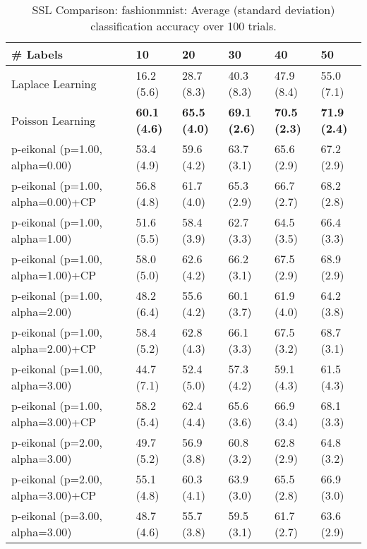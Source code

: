 \documentclass{article}
\begin{document}
\begin{table*}[t!]
\vspace{-3mm}
\caption{SSL Comparison: fashionmnist: Average (standard deviation) classification accuracy over 100 trials.}
\vspace{-3mm}
\label{tab:SSL Comparison: fashionmnist}
\vskip 0.15in
\begin{center}
\begin{small}
\begin{sc}
\begin{tabular}{llllll}
\toprule
\# Labels&\textbf{10}&\textbf{20}&\textbf{30}&\textbf{40}&\textbf{50}\\
\midrule
Laplace Learning&16.2 (5.6)      &28.7 (8.3)      &40.3 (8.3)      &47.9 (8.4)      &55.0 (7.1)      \\
Poisson Learning&{\bf 60.1 (4.6)}&{\bf 65.5 (4.0)}&{\bf 69.1 (2.6)}&{\bf 70.5 (2.3)}&{\bf 71.9 (2.4)}\\
p-eikonal (p=1.00, alpha=0.00)&53.4 (4.9)      &59.6 (4.2)      &63.7 (3.1)      &65.6 (2.9)      &67.2 (2.9)      \\
p-eikonal (p=1.00, alpha=0.00)+CP&56.8 (4.8)      &61.7 (4.0)      &65.3 (2.9)      &66.7 (2.7)      &68.2 (2.8)      \\
p-eikonal (p=1.00, alpha=1.00)&51.6 (5.5)      &58.4 (3.9)      &62.7 (3.3)      &64.5 (3.5)      &66.4 (3.3)      \\
p-eikonal (p=1.00, alpha=1.00)+CP&58.0 (5.0)      &62.6 (4.2)      &66.2 (3.1)      &67.5 (2.9)      &68.9 (2.9)      \\
p-eikonal (p=1.00, alpha=2.00)&48.2 (6.4)      &55.6 (4.2)      &60.1 (3.7)      &61.9 (4.0)      &64.2 (3.8)      \\
p-eikonal (p=1.00, alpha=2.00)+CP&58.4 (5.2)      &62.8 (4.3)      &66.1 (3.3)      &67.5 (3.2)      &68.7 (3.1)      \\
p-eikonal (p=1.00, alpha=3.00)&44.7 (7.1)      &52.4 (5.0)      &57.3 (4.2)      &59.1 (4.3)      &61.5 (4.3)      \\
p-eikonal (p=1.00, alpha=3.00)+CP&58.2 (5.4)      &62.4 (4.4)      &65.6 (3.6)      &66.9 (3.4)      &68.1 (3.3)      \\
p-eikonal (p=2.00, alpha=3.00)&49.7 (5.2)      &56.9 (3.8)      &60.8 (3.2)      &62.8 (2.9)      &64.8 (3.2)      \\
p-eikonal (p=2.00, alpha=3.00)+CP&55.1 (4.8)      &60.3 (4.1)      &63.9 (3.0)      &65.5 (2.8)      &66.9 (3.0)      \\
p-eikonal (p=3.00, alpha=3.00)&48.7 (4.6)      &55.7 (3.8)      &59.5 (3.1)      &61.7 (2.7)      &63.6 (2.9)      \\

\end{tabular}
\end{sc}
\end{small}
\end{center}
\end{table*}
\end{document}
